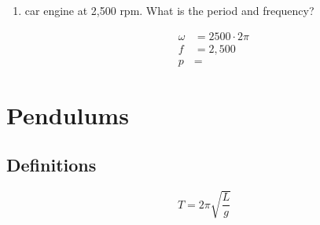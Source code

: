 \documentclass{exam}
\begin{document}
\begin{enumerate}
    \item car engine at 2,500 rpm.  What is the period and frequency?
      \begin{solution}
        \begin{align*}
          \omega &= 2500 \cdot 2 \pi \\
          f &= 2,500 \\
          p &= 
        \end{align*}
      \end{solution}
  \end{enumerate}

  \section{Pendulums}

  \subsection{Definitions}
  \[
    T = 2 \pi \sqrt{\frac{L}{g}}
  \]
\end{document}
